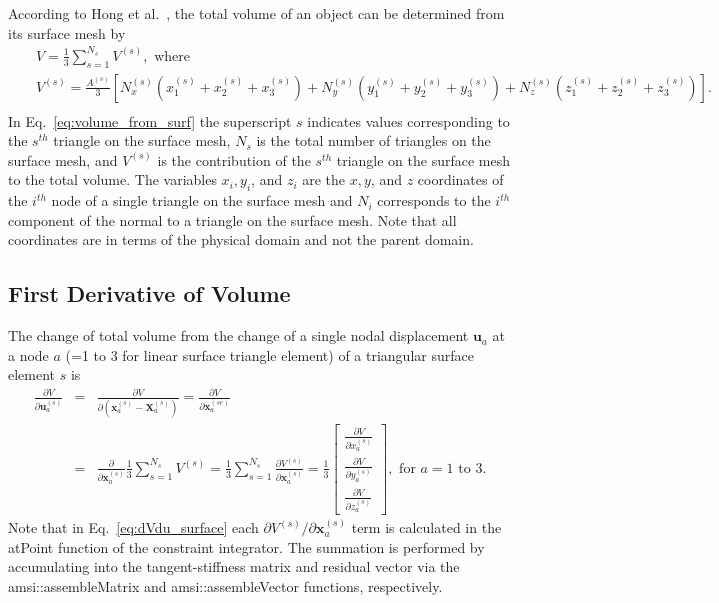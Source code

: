 According to Hong et al.\ \cite{Hong:2006vz}, the total volume of an object can be determined from its surface mesh by
%
\begin{eqnarray}
&&V = \frac{1}{3}\sum_{s=1}^{N_s} V^{(s)}, \text{ where } \nonumber\\
&&V^{(s)} =  \frac{A^{(s)}}{3}\left[ N^{(s)}_x (x^{(s)}_1 + x^{(s)}_2 + x^{(s)}_3) + N^{(s)}_y (y^{(s)}_1 + y^{(s)}_2 + y^{(s)}_3) + N^{(s)}_z (z^{(s)}_1 + z^{(s)}_2 + z^{(s)}_3) \right]. \nonumber\\
\label{eq:volume_from_surf}
\end{eqnarray}
% 
In Eq.\ \eqref{eq:volume_from_surf} the superscript $s$ indicates values corresponding to the $s^{th}$ triangle on the surface mesh, $N_s$ is the total number of triangles on the surface mesh, and $V^{(s)}$ is the contribution of the $s^{th}$ triangle on the surface mesh to the total volume. The variables $x_i, y_i$, and $z_i$ are the $x, y$, and $z$ coordinates of the $i^{th}$ node of a single triangle on the surface mesh and $N_i$ corresponds to the $i^{th}$ component of the normal to a triangle on the surface mesh. Note that all coordinates are in terms of the physical domain and not the parent domain.

\subsection{First Derivative of Volume}
The change of total volume from the change of a single nodal displacement $\pmb{u}_a$ at a node $a$ (=1 to 3 for linear surface triangle element) of a triangular surface element $s$ is
%
\begin{eqnarray}
\frac{\partial V}{\partial \pmb{u}_a^{(s)}} &=& \frac{\partial V}{\partial (\pmb{x}_a^{(s)}-\pmb{X}_a^{(s)})} = \frac{\partial V}{\partial \pmb{x}_a^{(se)}} \nonumber\\
&=& \frac{\partial}{\partial \pmb{x}_a^{(s)}} \frac{1}{3} \sum_{s=1}^{N_s}V^{(s)} = \frac{1}{3} \sum_{s=1}^{N_s}\frac{\partial V^{(s)}}{\partial \pmb{x}_a^{(s)}}
= \frac{1}{3} \begin{bmatrix}
\frac{\partial V}{\partial x_a^{(s)}} \\ \frac{\partial V}{\partial y_a^{(s)}} \\ \frac{\partial V}{\partial z_a^{(s)}}
\end{bmatrix}, \text { for } a = 1 \text{ to } 3.
\label{eq:dVdu_surface}
\end{eqnarray}
%
Note that in Eq.\ \eqref{eq:dVdu_surface} each $\partial V^{(s)}/\partial \pmb{x}_a^{(s)}$ term is calculated in the atPoint function of the constraint integrator. The summation is performed by accumulating into the tangent-stiffness matrix and residual vector via the amsi::assembleMatrix and amsi::assembleVector functions, respectively.

